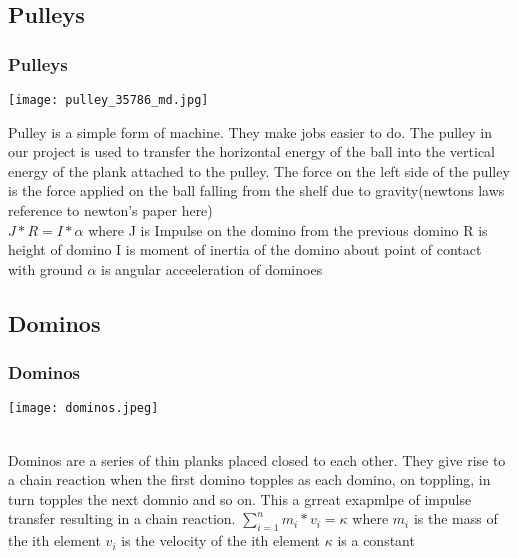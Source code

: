 \subsection{Pulleys}
\begin{frame}
  \frametitle{Pulleys}
  \begin{center}
  \texttt{[image: pulley\_35786\_md.jpg]}
  \end{center}
  Pulley is a simple form of machine. They make jobs easier to do. The pulley in our project is used to transfer the horizontal energy of the ball into the vertical energy of the plank attached to the pulley. The force on the left side of the pulley is the force applied on the ball falling from the shelf due to gravity(newtons laws reference to newton's paper here) \\
	\linebreak
\(
 J*R = I*\alpha \)
	\linebreak
	where 
	\linebreak
	J is Impulse on the domino from the previous domino
	\linebreak
	R is height of domino
	\linebreak
	I is moment of inertia of the domino about point of contact with ground
	\linebreak
\(
	\alpha \)
 is angular acceeleration of dominoes
\end{frame}

\subsection{Dominos}
\begin{frame}
  \frametitle{Dominos}
  \begin{center}
  \texttt{[image: dominos.jpeg]}
  \end{center}
  \\
  Dominos are a series of thin planks placed closed to each other. They give rise to a chain reaction when the first domino topples as each domino, on toppling, in turn topples the next domnio and so on. This a grreat exapmlpe of impulse transfer resulting in a chain reaction.
\linebreak
\(
	\sum_{i=1}^{n} m_i*v_i = \kappa
\)
\linebreak
 where
\linebreak
\(
m_i 
\)
is the mass of the ith element
\linebreak
\(
v_i 
\)
is the velocity of the ith element
\linebreak
\(
\kappa 
\)
is a constant
\linebreak
\end{frame} 

